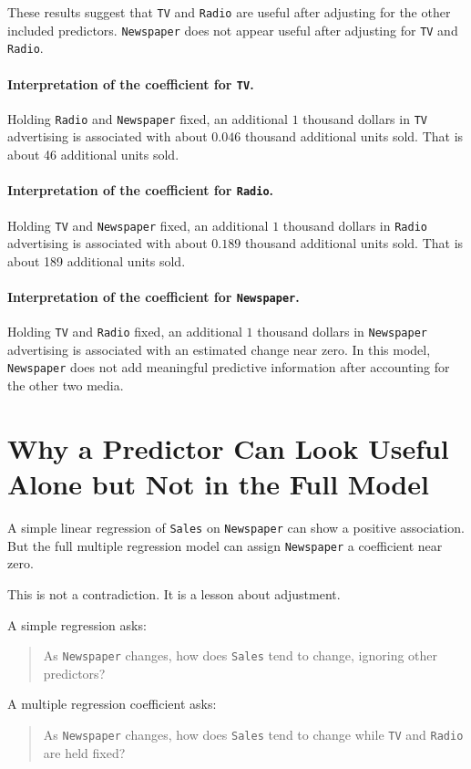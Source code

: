 These results suggest that \texttt{TV} and \texttt{Radio} are useful after adjusting for the other included predictors.  \texttt{Newspaper} does not appear useful after adjusting for \texttt{TV} and \texttt{Radio}.

\paragraph{Interpretation of the coefficient for \texttt{TV}.}
Holding \texttt{Radio} and \texttt{Newspaper} fixed, an additional \(1\) thousand dollars in \texttt{TV} advertising is associated with about \(0.046\) thousand additional units sold.  That is about 46 additional units sold.

\paragraph{Interpretation of the coefficient for \texttt{Radio}.}
Holding \texttt{TV} and \texttt{Newspaper} fixed, an additional \(1\) thousand dollars in \texttt{Radio} advertising is associated with about \(0.189\) thousand additional units sold.  That is about 189 additional units sold.

\paragraph{Interpretation of the coefficient for \texttt{Newspaper}.}
Holding \texttt{TV} and \texttt{Radio} fixed, an additional \(1\) thousand dollars in \texttt{Newspaper} advertising is associated with an estimated change near zero.  In this model, \texttt{Newspaper} does not add meaningful predictive information after accounting for the other two media.

\section{Why a Predictor Can Look Useful Alone but Not in the Full Model}

A simple linear regression of \texttt{Sales} on \texttt{Newspaper} can show a positive association.  But the full multiple regression model can assign \texttt{Newspaper} a coefficient near zero.

This is not a contradiction.  It is a lesson about adjustment.

A simple regression asks:
\begin{quote}
  As \texttt{Newspaper} changes, how does \texttt{Sales} tend to change, ignoring other predictors?
\end{quote}
A multiple regression coefficient asks:
\begin{quote}
  As \texttt{Newspaper} changes, how does \texttt{Sales} tend to change while \texttt{TV} and \texttt{Radio} are held fixed?
\end{quote}

